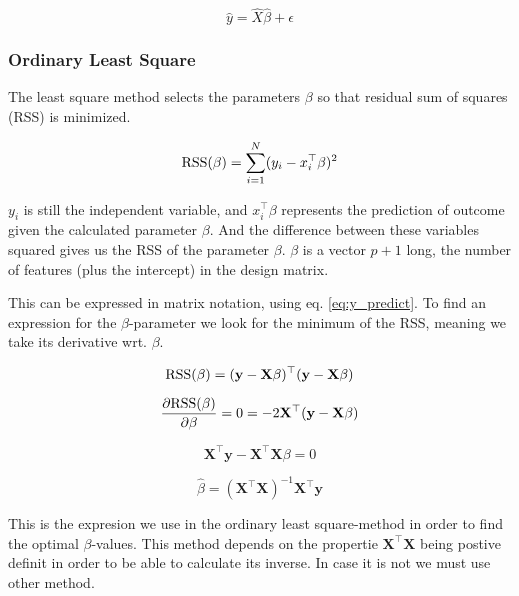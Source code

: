 \documentclass[a4paper,12pt, english]{article}
\begin{document}
\begin{equation} \label{eq:y_predict}
\hat{y} = \hat{X} \hat{\beta} + \epsilon
\end{equation}


\subsubsection{Ordinary Least Square} \label{sec:OLS}

The least square method selects the parameters $\beta$ so that residual sum of squares (RSS) is minimized.

\begin{equation*}
\textnormal{RSS}(\beta) = \sum_{i=1}^{N} (y_i - x_i^{\top}\beta)^2
\end{equation*}

$y_i$ is still the independent variable, and $x_i^{\top}\beta$ represents the prediction of outcome given the calculated parameter $\beta$. And the difference between these variables squared gives us the RSS of the parameter $\beta$. $\beta$ is a vector $p + 1$ long, the number of features (plus the intercept) in the design matrix. 

This can be expressed in matrix notation, using eq. \ref{eq:y_predict}. To find an expression for the $\beta$-parameter we look for the minimum of the RSS, meaning we take its derivative wrt. $\beta$.

\begin{equation*}
\textnormal{RSS}(\beta) = (\mathbf{y} - \mathbf{X}\beta)^{\top}(\mathbf{y} - \mathbf{X}\beta)
\end{equation*}

\begin{equation*}
\frac{\partial \textnormal{RSS}(\beta)}{\partial \beta} = 0 = -2 \mathbf{X}^{\top}(\mathbf{y} - \mathbf{X}\beta)
\end{equation*}

\begin{equation*}
\mathbf{X}^{\top}\mathbf{y} - \mathbf{X}^{\top}\mathbf{X} \beta = 0
\end{equation*}

\begin{equation} \label{eq:beta}
\hat{\beta} = (\mathbf{X}^{\top}\mathbf{X})^{-1}\mathbf{X}^{\top}\mathbf{y}
\end{equation}

This is the expresion we use in the ordinary least square-method in order to find the optimal $\beta$-values. This method depends on the propertie $\mathbf{X^{\top}}\mathbf{X}$ being postive definit in order to be able to calculate its inverse. In case it is not we must use other method.
\end{document}
